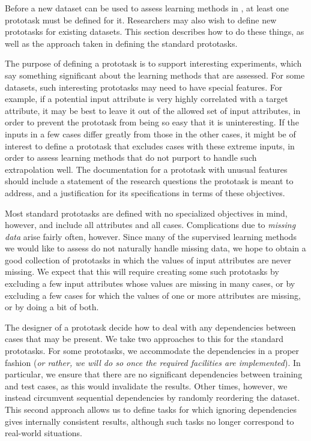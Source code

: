 Before a new dataset can be used to assess learning methods in
\delve{}, at least one prototask must be defined for it.  Researchers
may also wish to define new prototasks for existing datasets.  This
section describes how to do these things, as well as the approach
taken in defining the standard \delve{} prototasks.

The purpose of defining a prototask is to support interesting
experiments, which say something significant about the learning
methods that are assessed.  For some datasets, such interesting
prototasks may need to have special features. For example, if a
potential input attribute is very highly correlated with a target
attribute, it may be best to leave it out of the allowed set of input
attributes, in order to prevent the prototask from being so easy that
it is uninteresting.  If the inputs in a few cases differ greatly from
those in the other cases, it might be of interest to define a
prototask that excludes cases with these extreme inputs, in order to
assess learning methods that do not purport to handle such
extrapolation well.  The documentation for a prototask with unusual
features should include a statement of the research questions the
prototask is meant to address, and a justification for its
specifications in terms of these objectives.

Most standard \delve{} prototasks are defined with no specialized
objectives in mind, however, and include all attributes and all cases.
Complications due to \emph{missing data} arise fairly often, however.
Since many of the supervised learning methods we would like to assess
do not naturally handle missing data, we hope to obtain a good
collection of \delve{} prototasks in which the values of input
attributes are never missing.  We expect that this will require
creating some such prototasks by excluding a few input attributes
whose values are missing in many cases, or by excluding a few cases
for which the values of one or more attributes are missing, or by
doing a bit of both.  

The designer of a prototask decide how to deal with any dependencies
between cases that may be present.  We take two approaches to this for
the standard \delve{} prototasks.  For some prototasks, we accommodate
the dependencies in a proper fashion (\emph{or rather, we will do so
once the required facilities are implemented}).  In particular, we
ensure that there are no significant dependencies between training and
test cases, as this would invalidate the results.  Other times,
however, we instead circumvent sequential dependencies by randomly
reordering the dataset.  This second approach allows us to define
tasks for which ignoring dependencies gives internally consistent
results, although such tasks no longer correspond to real-world
situations.

